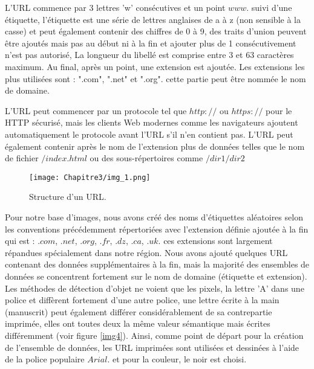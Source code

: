 L'URL commence par 3 lettres 'w' consécutives et un point \(www.\) suivi d'une étiquette, l'étiquette est une série de lettres anglaises de a à z (non sensible à la casse) et peut également contenir des chiffres de 0 à 9, des traits d'union peuvent être ajoutés mais pas au début ni à la fin et ajouter plus de 1 consécutivement n'est pas autorisé, La longueur du libellé est comprise entre 3 et 63 caractères maximum. Au final, après un point, une extension est ajoutée. Les extensions les plus utilisées sont : ".com", ".net" et ".org". cette partie peut être nommée le nom de domaine.

 L'URL peut commencer par un protocole tel que \(http://\) ou \(https://\) pour le HTTP sécurisé, mais les clients Web modernes comme les navigateurs ajoutent automatiquement le protocole avant l'URL s'il n'en contient pas. L'URL peut également contenir après le nom de l'extension plus de données telles que le nom de fichier \(/index.html\) ou des sous-répertoires comme \(/dir1/dir2\)\\
 
          \begin{figure}[H]
               \centering
               \texttt{[image: Chapitre3/img\_1.png]}
               \caption{Structure d'un URL.}
               \label{img3}
               \end{figure}

Pour notre base d'images, nous avons créé des noms d'étiquettes aléatoires selon les conventions précédemment répertoriées avec l'extension définie ajoutée à la fin qui est : \(.com\), \(.net\), \(.org\), \(.fr\), \(.dz\), \(.ca\), \(.uk\). ces extensions sont largement répandues spécialement dans notre région. Nous avons ajouté quelques URL contenant des données supplémentaires à la fin, mais la majorité des ensembles de données se concentrent fortement sur le nom de domaine (étiquette et extension).\\
          
Les méthodes de détection d'objet ne voient que les pixels, la lettre 'A' dans une police et diffèrent fortement d'une autre police, une lettre écrite à la main (manuscrit) peut également différer considérablement de sa contrepartie imprimée, elles ont toutes deux la même valeur sémantique mais écrites différemment (voir figure \ref{img4}). Ainsi, comme point de départ pour la création de l'ensemble de données, les URL imprimées sont utilisées et dessinées à l'aide de la police populaire \(Arial\). et pour la couleur, le noir est choisi.

